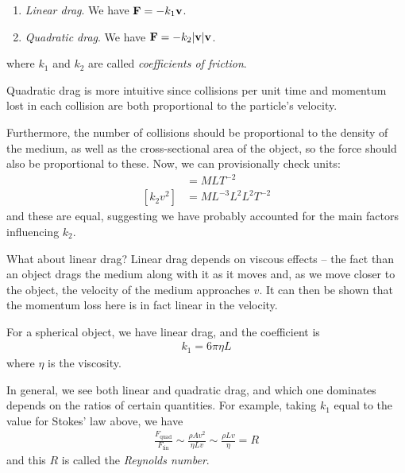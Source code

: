\documentclass{../../template/note}
\begin{document}
    \begin{enumerate}[label=\protect\circled{\arabic*}]
        \item \emph{Linear drag}. We have \(\V F = -k_1 \V v\).
        \item \emph{Quadratic drag}. We have \(\V F = -k_2 |\V v| \V v\).
    \end{enumerate}
    where \(k_1\) and \(k_2\) are called \emph{coefficients of friction}.

    Quadratic drag is more intuitive since collisions per unit time and momentum lost in each collision are both proportional to the particle's velocity.

    Furthermore, the number of collisions should be proportional to the density of the medium, as well as the cross-sectional area of the object, so the force should also be proportional to these. Now, we can provisionally check units:
    \begin{align*}
        [F] &= \si{MLT^{-2}} \\
        [k_2v^2] &= \si{ML^{-3}L^2L^2T^{-2}}
    \end{align*}
    and these are equal, suggesting we have probably accounted for the main factors influencing \(k_2\).

    What about linear drag? Linear drag depends on viscous effects -- the fact than an object drags the medium along with it as it moves and, as we move closer to the object, the velocity of the medium approaches \(v\). It can then be shown that the momentum loss here is in fact linear in the velocity.
    
    \begin{example*}
        For a spherical object, we have linear drag, and the coefficient is
        \begin{align*}
            k_1 = 6\pi \eta L
        \end{align*}
        where \(\eta\) is the viscosity.
    \end{example*}
    
    In general, we see both linear and quadratic drag, and which one dominates depends on the ratios of certain quantities. For example, taking \(k_1\) equal to the value for Stokes' law above, we have
    \begin{align*}
        \frac{F_\text{quad}}{F_\text{lin}} \sim \frac{\rho A v^2}{\eta L v} \sim \frac{\rho L v}{\eta} = R
    \end{align*}
    and this \(R\) is called the \emph{Reynolds number}.
\end{document}
